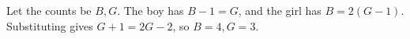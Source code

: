 Let the counts be $B,G$. The boy has $B-1=G$, and the girl has $B=2(G-1)$. Substituting gives $G+1=2G-2$, so $\boxed{B=4,G=3}$.

